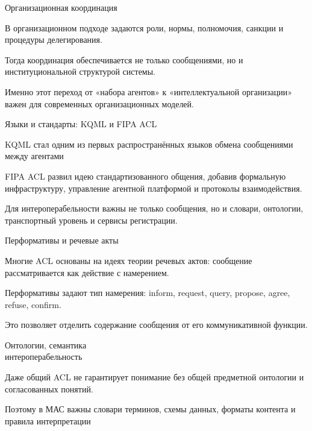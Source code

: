 \begin{frame}{Организационная координация}
	\topline
	\justifying
	\begin{textitemize}
		\item В организационном подходе задаются роли, нормы, полномочия, санкции и процедуры делегирования.
		\item Тогда координация обеспечивается не только сообщениями, но и институциональной структурой системы.
		\item Именно этот переход от «набора агентов» к «интеллектуальной организации» важен для современных организационных моделей.
	\end{textitemize}
\end{frame}

\begin{frame}{Языки и стандарты: KQML и FIPA ACL}
	\topline
	\justifying
	\begin{textitemize}
		\item KQML стал одним из первых распространённых языков обмена сообщениями между агентами
		\item FIPA ACL развил идею стандартизованного общения, добавив формальную инфраструктуру, управление агентной платформой и протоколы взаимодействия.
		\item Для интероперабельности важны не только сообщения, но и словари, онтологии, транспортный уровень и сервисы регистрации.
	\end{textitemize}
\end{frame}

\begin{frame}{Перформативы и речевые акты}
	\topline
	\justifying
	\begin{textitemize}
		\item Многие ACL основаны на идеях теории речевых актов: сообщение рассматривается как действие с намерением.
		\item Перформативы задают тип намерения: inform, request, query, propose, agree, refuse, confirm.
		\item Это позволяет отделить содержание сообщения от его коммуникативной функции.
	\end{textitemize}
\end{frame}

\begin{frame}{Онтологии, семантика\\ интероперабельность}
	\topline
	\justifying
	\begin{textitemize}
		\item Даже общий ACL не гарантирует понимание без общей предметной онтологии и согласованных понятий.
		\item Поэтому в МАС важны словари терминов, схемы данных, форматы контента и правила интерпретации
	\end{textitemize}
\end{frame}

